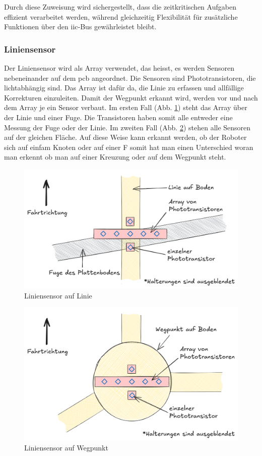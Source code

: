 Durch diese Zuweisung wird sichergestellt, dass die zeitkritischen Aufgaben effizient verarbeitet werden, während gleichzeitig Flexibilität für zusätzliche Funktionen über den \acrshort{iic}-Bus gewährleistet bleibt.


\subsubsection*{Liniensensor}


Der Liniensensor wird als Array verwendet, das heisst, es werden Sensoren nebeneinander auf dem \acrshort{pcb} angeordnet. Die Sensoren sind Phototransistoren, die lichtabhängig sind. Das Array ist dafür da, die Linie zu erfassen und allfällige Korrekturen einzuleiten. Damit der Wegpunkt erkannt wird, werden vor und nach dem Array je ein Sensor verbaut. Im ersten Fall (Abb. \ref{fig: Liniensensor auf Linie}) steht das Array über der Linie und einer Fuge. Die Transistoren haben somit alle entweder eine Messung der Fuge oder der Linie. Im zweiten Fall (Abb. \ref{fig: Liniensensor auf Wegpunkt}) stehen alle Sensoren auf der gleichen Fläche. Auf diese Weise kann erkannt werden, ob der Roboter sich auf einfam Knoten oder auf einer F somit hat man einen Unterschied woran man erkennt ob man auf einer Kreuzung oder auf dem Wegpunkt steht.


\begin{figure}[H]
    \centering
    \includegraphics[width=0.8\linewidth]{img/linesensor_on_line.png}
    \caption{Liniensensor auf Linie}
    \label{fig: Liniensensor auf Linie}
\end{figure}


\begin{figure}[H]
    \centering
    \includegraphics[width=0.8\linewidth]{img/linesensor_on_node.png}
    \caption{Liniensensor auf Wegpunkt}
    \label{fig: Liniensensor auf Wegpunkt}
\end{figure}




